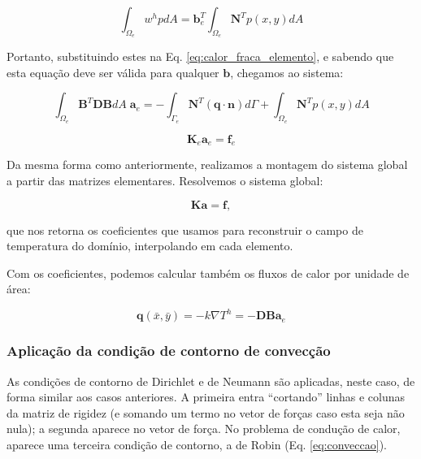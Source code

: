         \begin{equation}
            \int_{\Omega_e} w^h p dA =
            \mathbf{b}_e^T  \int_{\Omega_e} \mathbf{N}^T p(x,y) dA
        \end{equation}

        Portanto, substituindo estes na Eq. \eqref{eq:calor_fraca_elemento}, e sabendo que esta equação deve ser válida para qualquer $\mathbf{b}$, chegamos ao sistema:


        \begin{equation}
            \int_{\Omega_e} \mathbf{B}^T \mathbf{D} \mathbf{B} dA \; \mathbf{a}_e = 
            -\int_{\Gamma_e} \mathbf{N}^T \left(\mathbf{q} \cdot \mathbf{n}\right) d\Gamma +
            \int_{\Omega_e} \mathbf{N}^T p(x,y) dA
            \label{eq:calor_eq_elemento}
        \end{equation}


        \begin{equation}
            \mathbf{K}_e \mathbf{a}_e = \mathbf{f}_e
        \end{equation}

        Da mesma forma como anteriormente, realizamos a montagem do sistema global a partir das matrizes elementares. Resolvemos o sistema global:

        \begin{equation}
            \mathbf{K} \mathbf{a} = \mathbf{f},
        \end{equation}

        \noindent que nos retorna os coeficientes que usamos para reconstruir o campo de temperatura do domínio, interpolando em cada elemento.

        Com os coeficientes, podemos calcular também os fluxos de calor por unidade de área:

        \begin{equation}
            \mathbf{q}(\bar{x},\bar{y}) = - k \nabla T^h = - \mathbf{D} \mathbf{B} \mathbf{a}_e
            \label{eq:fluxo_reconstruido}
        \end{equation}

        \subsubsection*{Aplicação da condição de contorno de convecção}

        As condições de contorno de Dirichlet e de Neumann são aplicadas, neste caso, de forma similar aos casos anteriores. A primeira entra ``cortando'' linhas e colunas da matriz de rigidez (e somando um termo no vetor de forças caso esta seja não nula); a segunda aparece no vetor de força. No problema de condução de calor, aparece uma terceira condição de contorno, a de Robin (Eq. \eqref{eq:conveccao}).

